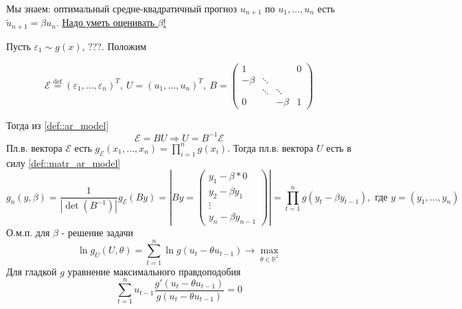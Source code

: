 \documentclass[12pt]{article}
\theoremstyle{basic_theorem}
\newcommand*{\defeq}{\stackrel{\text{def}}{=}}
\def\eps{ \varepsilon }
\def\Eps{ \mathcal{E} }
\def\R{ \mathbb{R} }
\begin{document}
Мы знаем: оптимальный средне-квадратичный прогноз $u_{n+1}$ по $u_1,\ldots,u_n$ есть $\widetilde{u}_{n+1}=\beta u_n$.
\underline{Надо уметь оценивать $\beta$!}

Пусть $\eps_1\sim g(x)$, ???. Положим

\[\Eps\defeq(\eps_1,\ldots,\eps_n)^T,\
  U=(u_1,\ldots,u_n)^T,\
  B=\begin{pmatrix}
    1   &        &        & 0 \\
 -\beta & \ddots &        &   \\
        & \ddots & \ddots &   \\
    0   &        & -\beta & 1
 \end{pmatrix}\]

Тогда из \eqref{def::ar_model}
\begin{equation} \label{def::matr_ar_model}
    \Eps=BU\Rightarrow U=B^{-1}\Eps
\end{equation}
Пл.в. вектора $\Eps$ есть $g_{\Eps}(x_1,\ldots,x_n)=\prod_{i=1}^ng(x_i)$.
Тогда пл.в. вектора $U$ есть в силу \eqref{def::matr_ar_model}
\[g_n(y,\beta)=\frac{1}{\left\lvert\det(B^{-1})\right\rvert}g_{\Eps}(By)=\left\lvert By=\begin{pmatrix}
    y_1-\beta * 0 \\
    y_2-\beta y_1 \\
    \vdots \\
    y_n-\beta y_{n-1}
\end{pmatrix}\right\rvert=\prod_{t=1}^ng(y_t-\beta y_{t-1}),\text{ где }y=(y_1,\ldots,y_n)\]
О.м.п. для $\beta$ - решение задачи
\begin{equation}\label{eq::omp_beta}
    \ln g_U(U,\theta)=\sum_{t=1}^n\ln g(u_t-\theta u_{t-1})\rightarrow\max_{\theta\in\R^1}
\end{equation}
Для гладкой $g$ уравнение максимального правдоподобия
\begin{equation}\label{eq::mp_beta}
    \sum_{t=1}^nu_{t-1}\frac{g'(u_t-\theta u_{t-1})}{g(u_t-\theta u_{t-1})}=0
\end{equation}
\end{document}
